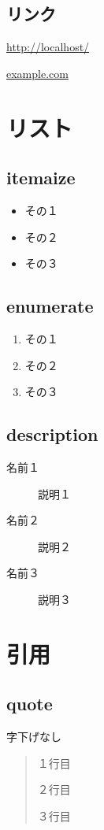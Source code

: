 \documentclass[a4paper,onecolumn,12pt]{jsarticle}
\begin{document}
\subsection{リンク}
\url{http://localhost/}

\href{http://www.example.com/}{example.com}

\section{リスト}

\subsection{itemaize}
\begin{itemize}
\item その１
\item その２
\item その３
\end{itemize}

\subsection{enumerate}
\begin{enumerate}
\item その１
\item その２
\item その３
\end{enumerate}

\subsection{description}
\begin{description}
  \item[名前１] 説明１
  \item[名前２] 説明２
  \item[名前３] 説明３
\end{description}

\section{引用}

\subsection{quote}
字下げなし
\begin{quote}
１行目

２行目

３行目
\end{quote}
\end{document}
